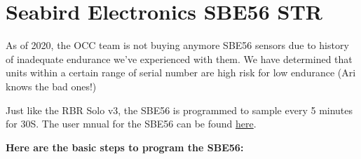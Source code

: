 \documentclass[
]{book}
\begin{document}
\hypertarget{sbe56}{%
\section{Seabird Electronics SBE56 STR}\label{sbe56}}

As of 2020, the OCC team is not buying anymore SBE56 sensors due to history of inadequate endurance we've experienced with them. We have determined that units within a certain range of serial number are high risk for low endurance (Ari knows the bad ones!)

Just like the RBR Solo v3, the SBE56 is programmed to sample every 5 minutes for 30S. The user mnual for the SBE56 can be found \href{https://drive.google.com/drive/folders/1ujFmH1pJ704ikrsc11Ji2eNeuIBQ5JMa}{here}.

\textbf{Here are the basic steps to program the SBE56:}
\end{document}
